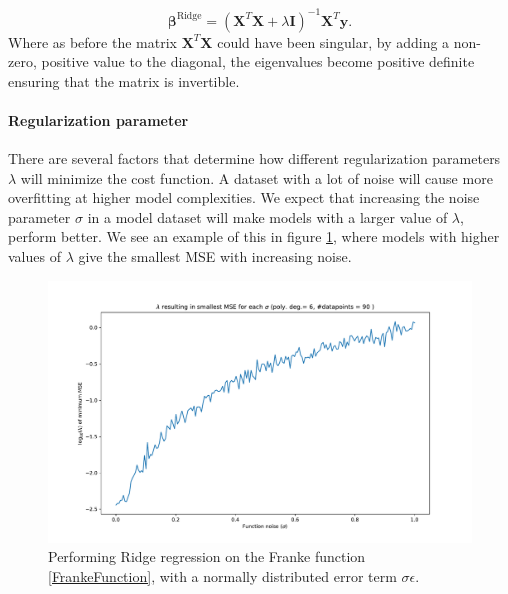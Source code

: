 \documentclass[11pt,a4paper,titlepage]{article}
\begin{document}
\begin{equation*}
    \boldsymbol{\beta}^{\mathrm{Ridge}} = \left(\boldsymbol{X}^T\boldsymbol{X}+\lambda\boldsymbol{I}\right)^{-1}\boldsymbol{X}^T\boldsymbol{y}.
\end{equation*}
Where as before the matrix $\boldsymbol{X}^T\boldsymbol{X}$ could have been singular, by adding a non- zero, positive value to the diagonal, the eigenvalues become positive definite ensuring that the matrix is invertible.
\paragraph*{Regularization parameter}
There are several factors that determine how different regularization parameters $\lambda$ will minimize the cost function. A dataset with a lot of noise will cause more overfitting at higher model complexities. We expect that increasing the noise parameter $\sigma$ in a model dataset will make models with a larger value of $\lambda$, perform better. We see an example of this in figure \ref{lambdatonoise}, where models with higher values of $\lambda$ give the smallest MSE with increasing noise.
\begin{figure}[H]
\centering

\includegraphics[trim=2cm 1.0cm 2cm 1.4cm, clip=true,scale = 0.5]{Smallest_MSE_lambda_over_noise.pdf}
\caption[Optimal regularization parameter to noise]{Performing Ridge regression on the Franke function \eqref{FrankeFunction}, with a normally distributed error term $\sigma\epsilon$.}\label{lambdatonoise}
\end{figure}
\end{document}
